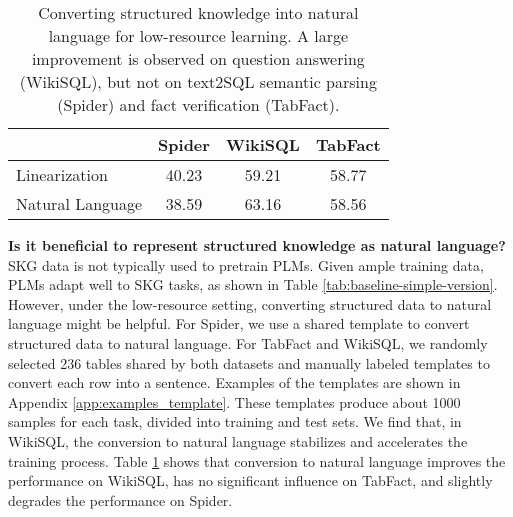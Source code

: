 \documentclass[11pt]{article}
\begin{document}
\begin{table}[t]
	\centering
	\small
	\begin{adjustbox}{width=0.85\linewidth}
		\begin{tabular}{@{}lccc@{}}
		    \toprule
			& Spider & WikiSQL & TabFact \\
			\midrule
			Linearization  & 40.23 & 59.21 & 58.77  \\
			Natural Language & 38.59 & 63.16 & 58.56  \\
			\bottomrule
		\end{tabular}
	\end{adjustbox}
	\caption{Converting structured knowledge into natural language for low-resource learning. 
	A large improvement is observed on question answering (WikiSQL), but not on text2SQL semantic parsing (Spider) and fact verification (TabFact). }
	\label{tab:convert-to-nl}
\end{table} \noindent\textbf{Is it beneficial to represent structured knowledge as natural language?}
SKG data is not typically used to pretrain PLMs. Given ample training data, PLMs adapt well to SKG tasks, as shown in Table \ref{tab:baseline-simple-version}. However, under the low-resource setting, converting structured data to natural language might be helpful. 
For Spider, we use a shared template to convert structured data to natural language. 
For TabFact and WikiSQL, we randomly selected 236 tables shared by both datasets and manually labeled templates to convert each row into a sentence. Examples of the templates are shown in Appendix \ref{app:examples_template}. These templates produce about 1000 samples for each task, divided into training and test sets. We find that, in WikiSQL, the conversion to natural language stabilizes and accelerates the training process. Table \ref{tab:convert-to-nl} shows that conversion to natural language improves the performance on WikiSQL, has no significant influence on TabFact, and slightly degrades the performance on Spider.
\end{document}
